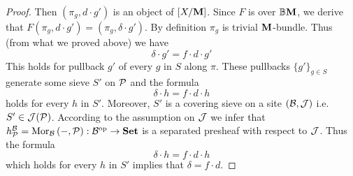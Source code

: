 \begin{proof}
Then $(\pi_g,d\cdot g')$ is an object of $[X/\mathbf{M}]$. Since $F$ is over $\mathbb{B}\mathbf{M}$, we derive that $F(\pi_g,d\cdot g') = (\pi_g,\delta \cdot g')$. By definition $\pi_g$ is trivial $\mathbf{M}$-bundle. Thus (from what we proved above) we have
$$\delta\cdot g' = f\cdot d\cdot g'$$
This holds for pullback $g'$ of every $g$ in $S$ along $\pi$. These pullbacks $\{g'\}_{g\in S}$ generate some sieve $S'$ on ${\mathcal P}$ and the formula
$$\delta\cdot h = f\cdot d\cdot h$$
holds for every $h$ in $S'$. Moreover, $S'$ is a covering sieve on a site $({\mathcal B},{\mathcal J})$ i.e. $S'\in {\mathcal J}({\mathcal P})$. According to the assumption on ${\mathcal J}$ we infer that $h^{{\mathcal B}}_{{\mathcal P}} = \mathrm{Mor}_{{\mathcal B}}\left(-,{\mathcal P}\right):{\mathcal B}^{\mathrm{op}}\rightarrow \mathbf{Set}$ is a separated presheaf with respect to ${\mathcal J}$. Thus the formula
$$\delta\cdot h = f\cdot d\cdot h$$
which holds for every $h$ in $S'$ implies that $\delta = f\cdot d$.
\end{proof}





































